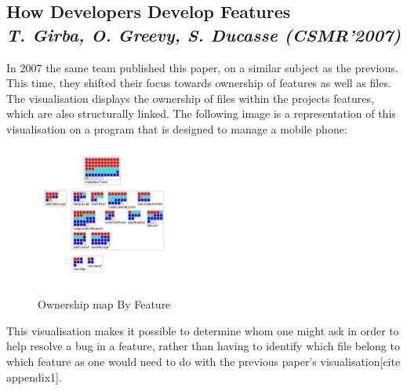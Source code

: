 \subsection{How Developers Develop Features\\ \textit{T. Girba, O. Greevy, S. Ducasse (CSMR'2007)}}

In 2007 the same team published this paper\cite{Girba2007}, on a similar subject as the previous. This time, they shifted their focus towards ownership of features as well as files. The visualisation displays the ownership of files within the projects features, which are also structurally linked. The following image is a representation of this visualisation on a program that is designed to manage a mobile phone:

\begin{figure}[H]
\centering
\includegraphics[width=0.4\textwidth]{./resources/girba2007.png}~
\caption{Ownership map By Feature}
\label{fig:ownership_map_by_feature}
\end{figure}

This visualisation makes it possible to determine whom one might ask in order to help resolve a bug in a feature, rather than having to identify which file belong to which feature as one would need to do with the previous paper's visualisation[cite appendix1].